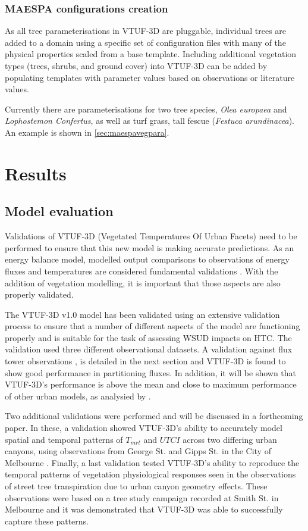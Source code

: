 \documentclass[final,3p,times,authoryear]{elsarticle}
\begin{document}
\subsubsection{MAESPA configurations creation}\label{section:MaespaTreeConfig}




As all tree parameterisations in VTUF-3D are pluggable, individual trees are added to a domain using a specific set of configuration files with many of the physical properties scaled from a base template.  Including additional vegetation types (trees, shrubs, and ground cover) into VTUF-3D can be added by populating templates with parameter values based on observations or literature values. 

Currently there are parameterisations for two tree species, \textit{Olea europaea} and \textit{Lophostemon Confertus}, as well as turf grass, tall fescue (\textit{Festuca arundinacea}). An example is shown in \ref{sec:maespavegpara}.  


\section{Results}
\subsection{Model evaluation}
Validations of VTUF-3D (Vegetated Temperatures Of Urban Facets) need to be performed to ensure that this new model is making accurate predictions. As an energy balance model, modelled output comparisons to observations of energy fluxes and temperatures are considered fundamental validations \citep{Masson2002a}. With the addition of vegetation modelling, it is important that those aspects are also properly validated. 

The VTUF-3D v1.0 model has been validated using an extensive validation process to ensure that a number of different aspects of the model are functioning properly and is suitable for the task of assessing WSUD impacts on HTC. The validation used three different observational datasets. A validation against flux tower observations \citep{Coutts2007}, is detailed in the next section and VTUF-3D is found to show good performance in partitioning fluxes. In addition, it will be shown that VTUF-3D's performance is above the mean and close to maximum performance of other urban models, as analysied by \cite{Best2012}. 

Two additional validations were performed and will be discussed in a forthcoming paper. In these, a validation showed VTUF-3D's ability to accurately model spatial and temporal patterns of $T_{mrt}$ and $UTCI$ across two differing urban canyons, using observations from George St. and Gipps St. in the City of Melbourne \citep{Coutts2015,White2012}. Finally, a last validation tested VTUF-3D's ability to reproduce the temporal patterns of vegetation physiological responses seen in the observations of street tree transpiration due to urban canyon geometry effects. These observations were based on a  tree study campaign recorded at Smith St. in Melbourne \citep{Gebert2012,Coutts2014a} and it was demonstrated that VTUF-3D was able to successfully capture these patterns.
\end{document}
